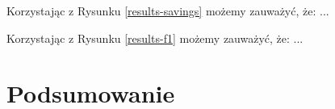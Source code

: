 \documentclass{book}
\begin{document}
	Korzystając z Rysunku \ref{results-savings} możemy zauważyć, że: ...
	
	Korzystając z Rysunku \ref{results-f1} możemy zauważyć, że: ...	
	

\chapter{Podsumowanie}



\end{document}
